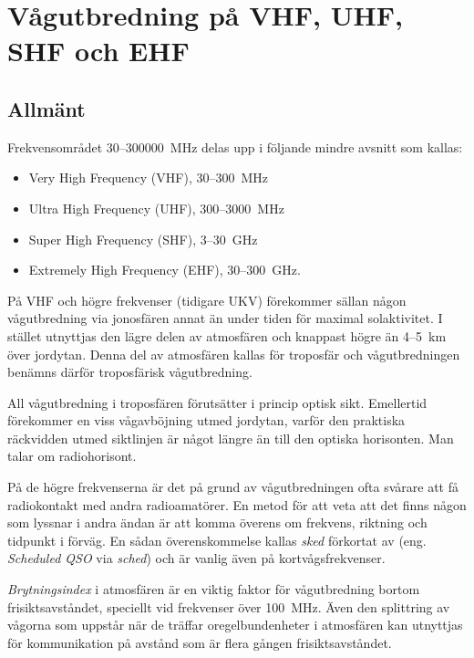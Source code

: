\section[Vågutbredning på VHF-EHF]{Vågutbredning på VHF, UHF, SHF och EHF}

\subsection{Allmänt}
Frekvensområdet 30--300000~MHz delas upp
i följande mindre avsnitt som kallas:
\begin{itemize}
  \item Very High Frequency (VHF), 30--300~MHz
  \item Ultra High Frequency (UHF), 300--3000~MHz
  \item Super High Frequency (SHF), 3--30~GHz
  \item Extremely High Frequency (EHF), 30--300~GHz.
\end{itemize}

På VHF och högre frekvenser (tidigare UKV) förekommer sällan någon
vågutbredning via jonosfären annat än under tiden för maximal solaktivitet.
I stället utnyttjas den lägre delen av atmosfären och
knappast högre än 4--5~km över jordytan.
Denna del av atmosfären kallas för troposfär och vågutbredningen benämns därför
troposfärisk vågutbredning.

All vågutbredning i troposfären förutsätter i princip optisk sikt.
Emellertid förekommer en viss vågavböjning utmed jordytan, varför den praktiska
räckvidden utmed siktlinjen är något längre än till den optiska horisonten.
Man talar om radiohorisont.

På de högre frekvenserna är det på grund av vågutbredningen ofta svårare att
få radiokontakt med andra radioamatörer.
En metod för att veta att det finns någon som lyssnar i andra ändan är att komma
överens om frekvens, riktning och tidpunkt i förväg.
En sådan överenskommelse kallas \emph{sked} förkortat av
(eng. \emph{Scheduled QSO} via \emph{sched}) och är vanlig även på
kortvågsfrekvenser.

\emph{Brytningsindex} i atmosfären är en viktig faktor för
vågutbredning bortom frisiktsavståndet, speciellt vid frekvenser över 100~MHz.
Även den splittring av vågorna som uppstår när de träffar oregelbundenheter i
atmosfären kan utnyttjas för kommunikation på avstånd som är flera gången
frisiktsavståndet.

